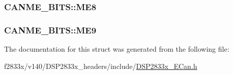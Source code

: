 \subsubsection[{M\+E8}]{ C\+A\+N\+M\+E\+\_\+\+B\+I\+T\+S\+::\+M\+E8}\label{struct_c_a_n_m_e___b_i_t_s_a2cadabf48002c9b2359d7479ca7ea4cf}
\hypertarget{struct_c_a_n_m_e___b_i_t_s_a5e31f98155ca762ecd5fb1c2d0920ae9}{}
\subsubsection[{M\+E9}]{ C\+A\+N\+M\+E\+\_\+\+B\+I\+T\+S\+::\+M\+E9}\label{struct_c_a_n_m_e___b_i_t_s_a5e31f98155ca762ecd5fb1c2d0920ae9}


The documentation for this struct was generated from the following file\+:\begin{DoxyCompactItemize}
\item 
f2833x/v140/\+D\+S\+P2833x\+\_\+headers/include/\hyperlink{_d_s_p2833x___e_can_8h}{D\+S\+P2833x\+\_\+\+E\+Can.\+h}\end{DoxyCompactItemize}
